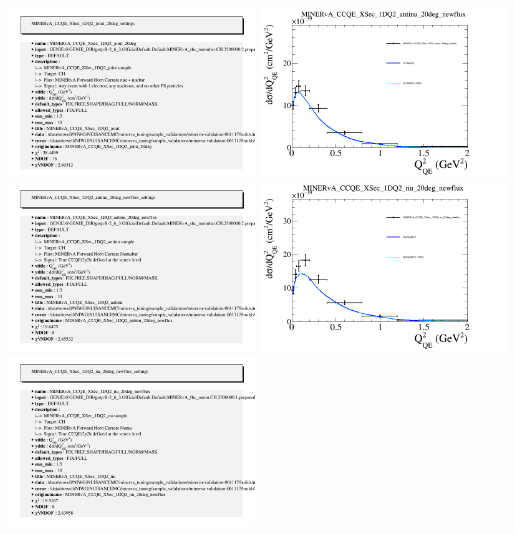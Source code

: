 \documentclass{article}
\begin{document}
\includegraphics[width=0.49\textwidth]{figures/nuisance_MINERvA_CCQE_XSec_1DQ2_joint_20deg_info.png}
\centering
\includegraphics[width=0.49\textwidth]{figures/nuisance_MINERvA_CCQE_XSec_1DQ2_antinu_20deg_newflux_comp.png}
\includegraphics[width=0.49\textwidth]{figures/nuisance_MINERvA_CCQE_XSec_1DQ2_antinu_20deg_newflux_info.png}
\centering
\includegraphics[width=0.49\textwidth]{figures/nuisance_MINERvA_CCQE_XSec_1DQ2_nu_20deg_newflux_comp.png}
\includegraphics[width=0.49\textwidth]{figures/nuisance_MINERvA_CCQE_XSec_1DQ2_nu_20deg_newflux_info.png}
\end{document}
